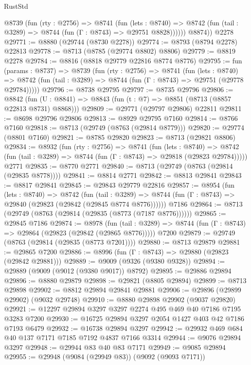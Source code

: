 \begin{lexlean}{RustStd}
\begin{coremodule}
          @8739
            (fun (rty : @2756) =>
            @8741
              (fun (lets : @8740) =>
              @8742 (fun (tail : @3289) => @8744 (fun (Γ : @8743) => @29751 @8828))))))
        @8874))
    @2278
@29771 := @8880 (@29744 (@8730 @2278))
@29774 := @8793 (@8794 @2278) @22813
@29778 := @8713 (@8785 (@29774 @8802) @8806)
@29779 := @8819 @2278
@29784 := @8816 (@8818 @29779 @22816 @8774 @8776)
@29795 := fun (params : @8737) =>
  @8739
    (fun (rty : @2756) =>
    @8741
      (fun (lets : @8740) =>
      @8742 (fun (tail : @3289) => @8744 (fun (Γ : @8743) => @29751 (@29778 @29784)))))
@29796 := @8738 @29795
@29797 := @8735 @29796
@29806 := @8842
    (fun (U : @8841) => @8843 (fun (t : @7) => @8851 (@8713 (@8857 @22813 @8731) @8868)))
@29809 := @29771 (@29797 @29806) @22811
@29811 := @8698 @29796 @29806
@29813 := @8929 @29795 @7160
@29814 := @8766 @7160
@29818 := @8713 (@29749 (@8763 (@29814 @8779)))
@29820 := @29774 (@8801 @7160)
@29821 := @8785 @29820
@29823 := @8713 (@29821 @8806)
@29834 := @8932
    (fun (rty : @2756) =>
    @8741
      (fun (lets : @8740) =>
      @8742 (fun (tail : @3289) => @8744 (fun (Γ : @8743) => @29818 (@29823 @29784)))))
    @2771
@29835 := @8770 @2771
@29840 := @8713 (@29749 (@8763 (@29814 (@29835 @8778))))
@29841 := @8814 @2771
@29842 := @8813 @29841
@29843 := @8817 @29841
@29845 := @29843 @29779 @22816
@29857 := @8954
    (fun (lets : @8740) =>
    @8742
      (fun (tail : @3289) =>
      @8744 (fun (Γ : @8743) => @29840 (@29823 (@29842 (@29845 @8774 @8776))))))
    @7186
@29864 := @8713 (@29749 (@8763 (@29814 (@29835 (@8773 (@7187 @8776))))))
@29865 := @29845 @7186
@29874 := @8978
    (fun (tail : @3289) => @8744 (fun (Γ : @8743) => @29864 (@29823 (@29842 (@29865 @8776)))))
    @7200
@29879 := @29749 (@8763 (@29814 (@29835 (@8773 @7201))))
@29880 := @8713 @29879
@29881 := @29865 @7200
@29886 := @8996 (fun (Γ : @8743) => @29880 (@29823 (@29842 @29881)))
@29889 := @9009 (@9326 (@9380 @9328))
@29894 := @29889 (@9009 (@9012 (@9380 @9017)) @8792)
@29895 := @29886 @29894
@29896 := @8880 @29879
@29898 := @29821 (@8805 @29894)
@29899 := @8713 @29898
@29902 := @8812 @29894 @29841 @29881
@29906 := @29896 (@29899 @29902) (@9032 @29748)
@29910 := @8880 @29898 @29902 (@9037 @29820)
@29921 := @12297 @29894 @3297 @3297 @2274 @495 @469 @40 @7186 @7195 @3283 @7200
@29930 := @16725 @29894 @3297 @2054 @1427 @403 @42 @7186 @7193 @6479
@29932 := @16738 @29894 @3297
@29942 := @29932 @469 @684 @40 @137 @7171 @7185 @7192 @4837 @7166 @3314
@29944 := @9076 @29894 @3297
@29948 := @29944 @83 @40 @83 @7171
@29949 := @9085 @29894
@29955 := @29948 (@9084 (@29949 @83)) (@9092 (@9093 @7171))

\end{coremodule}
\end{lexlean}
